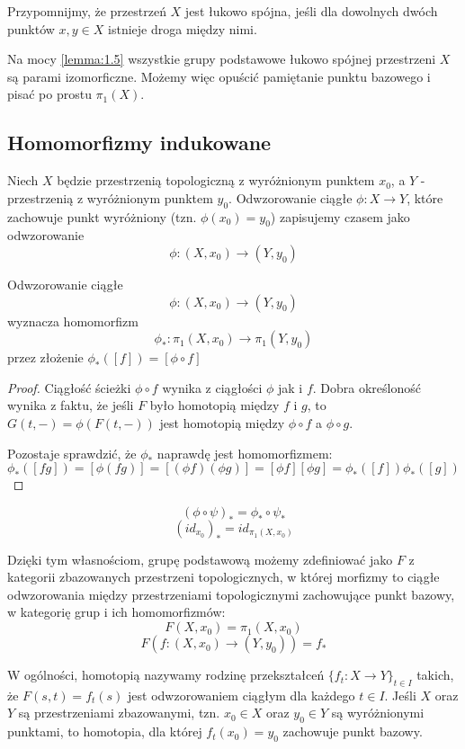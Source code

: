 Przypomnijmy, że przestrzeń $X$ jest łukowo spójna, jeśli dla dowolnych dwóch punktów $x, y\in X$ istnieje droga między nimi.

\begin{uwaga}
  Na mocy \ref{lemma:1.5} wszystkie grupy podstawowe łukowo spójnej przestrzeni $X$ są parami izomorficzne. Możemy więc opuścić pamiętanie punktu bazowego i pisać po prostu $\pi_1(X)$.
\end{uwaga}

\subsection{Homomorfizmy indukowane}

Niech $X$ będzie przestrzenią topologiczną z wyróżnionym punktem $x_0$, a $Y$ - przestrzenią z wyróżnionym punktem $y_0$. Odwzorowanie ciągłe $\phi:X\to Y$, które zachowuje punkt wyróżniony (tzn. $\phi(x_0)=y_0$) zapisujemy czasem jako odwzorowanie 
$$\phi:(X, x_0)\to (Y, y_0)$$

\begin{fact}
  Odwzorowanie ciągłe
  $$\phi:(X, x_0)\to (Y, y_0)$$
  wyznacza homomorfizm 
  $$\phi_*:\pi_1(X, x_0)\to \pi_1(Y, y_0)$$
  przez złożenie $\phi_*([f])=[\phi\circ f]$
\end{fact}

\begin{proof}
  Ciągłość ścieżki $\phi\circ f$ wynika z ciągłości $\phi$ jak i $f$. Dobra określoność wynika z faktu, że jeśli $F$ było homotopią między $f$ i $g$, to $G(t, -)=\phi(F(t, -))$ jest homotopią między $\phi\circ f$ a $\phi\circ g$.

  Pozostaje sprawdzić, że $\phi_*$ naprawdę jest homomorfizmem: 
  $$\phi_*([fg])=[\phi(fg)]=[(\phi f)(\phi g)]=[\phi f][\phi g]=\phi_*([f])\phi_*([g])$$
\end{proof}

\begin{fact} 
     $$(\phi\circ\psi)_*=\phi_*\circ \psi_*$$
     $$(id_{x_0})_*=id_{\pi_1(X, x_0)}$$
\end{fact}

Dzięki tym własnościom, grupę podstawową możemy zdefiniować jako  $F$ z kategorii zbazowanych przestrzeni topologicznych, w której morfizmy to ciągłe odwzorowania między przestrzeniami topologicznymi zachowujące punkt bazowy, w kategorię grup i ich homomorfizmów:
$$F(X, x_0)=\pi_1(X, x_0)$$
$$F(f:(X, x_0)\to (Y, y_0))=f_*$$

\begin{definition}
W ogólności, homotopią nazywamy rodzinę przekształceń $\{f_t:X\to Y\}_{t\in I}$ takich, że $F(s, t)=f_t(s)$ jest odwzorowaniem ciągłym dla każdego $t\in I$. Jeśli $X$ oraz $Y$ są przestrzeniami zbazowanymi, tzn. $x_0\in X$ oraz $y_0\in Y$ są wyróżnionymi punktami, to homotopia, dla której $f_t(x_0)=y_0$ zachowuje punkt bazowy.
\end{definition}


